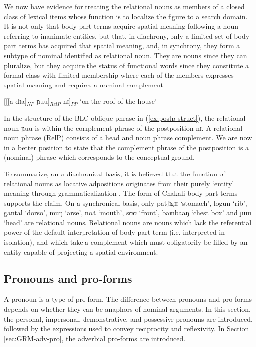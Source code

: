 \begin{exe}
\begin{exe}
\begin{exe}
{\begin{exe}
\begin{exe}
\begin{exe}
\begin{exe}
\begin{exe}
\begin{exe}
We now have  evidence for treating the relational nouns as
members of a closed class of lexical items whose function is to localize the
figure to a
search domain.  It is not only that body part terms acquire spatial meaning
following a noun referring to inanimate entities, but that, in diachrony, 
only a limited set of body part
terms has acquired that spatial meaning,  and, in synchrony, 
they form a subtype of nominal identified as relational noun. They are 
nouns since they can pluralize, but they acquire the status of functional words
since they constitute a formal class with limited membership where each of
the members expresses spatial meaning and requires a nominal complement.

\ea\label{ex:postp-struct}
 [[[a dɪa]$_{NP}$ ɲuu]$_{RelP}$ nɪ]$_{PP}$   `on the roof of the house' 
\z

In the structure  of the BLC oblique  phrase  in (\ref{ex:postp-struct}), the 
relational noun {\sls ɲuu} is within the complement phrase of the postposition 
{\sls 
nɪ}.  A relational noun phrase (RelP) consists of a head  and noun phrase 
complement.  We are now in a  better position to state that the complement 
phrase of the postposition is a (nominal) phrase which corresponds to the 
conceptual ground. 


To summarize, on a diachronical basis, it is believed that the function of 
relational nouns  as locative adpositions originates from their purely `entity'
meaning
through grammaticalization \citep[44, 83]{Hein84}. The form of Chakali body part
terms supports the claim.   On a synchronical basis, only  {\sls patʃɪgɪɪ}
`stomach',  {\sls logun } `rib',  {\sls gantal} `dorso', {\sls muŋ}   `arse', 
{\sls 
nʊã} `mouth',  {\sls sʊʊ} `front', {\sls bambaaŋ} `chest box'  and {\sls ɲuu} 
`head'
are relational nouns. Relational nouns are  nouns which lack the 
referential power of the default interpretation of  body part term  (i.e.
interpreted in  isolation), and which take a
complement which must obligatorily be filled by an entity capable of projecting
a spatial environment.



\subsection{Pronouns and pro-forms}
\label{sec:GRM-pronouns}

 A pronoun is a type of pro-form.  The difference between pronouns and 
pro-forms depends on whether they can be 
anaphors of nominal arguments. In 
this section, the personal, impersonal,
demonstrative, and possessive pronouns are introduced, followed by the
expressions used to convey reciprocity and reflexivity.   In
Section \ref{sec:GRM-adv-pro},  the adverbial pro-forms are  introduced.



\end{exe}
\end{exe}
\end{exe}
\end{exe}
\end{exe}
\end{exe}}
\end{exe}
\end{exe}
\end{exe}
